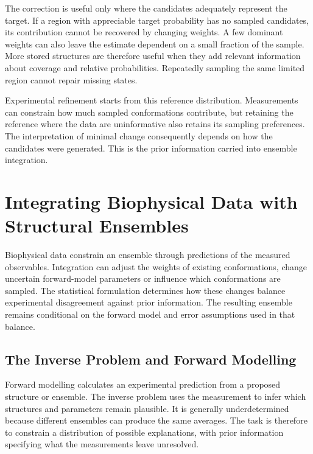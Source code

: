 The correction is useful only where the candidates adequately represent the target. If a region with appreciable target probability has no sampled candidates, its contribution cannot be recovered by changing weights. A few dominant weights can also leave the estimate dependent on a small fraction of the sample.\supercite{bmsb2012ch2} More stored structures are therefore useful when they add relevant information about coverage and relative probabilities. Repeatedly sampling the same limited region cannot repair missing states.

Experimental refinement starts from this reference distribution. Measurements can constrain how much sampled conformations contribute, but retaining the reference where the data are uninformative also retains its sampling preferences. The interpretation of minimal change consequently depends on how the candidates were generated. This is the prior information carried into ensemble integration.

\section{Integrating Biophysical Data with Structural Ensembles}
\label{sec:bg-integration}

Biophysical data constrain an ensemble through predictions of the measured observables. Integration can adjust the weights of existing conformations, change uncertain forward-model parameters or influence which conformations are sampled. The statistical formulation determines how these changes balance experimental disagreement against prior information.\supercite{bmsb2012ch12,cesariUsingMaximumEntropy2018} The resulting ensemble remains conditional on the forward model and error assumptions used in that balance.

\subsection{The Inverse Problem and Forward Modelling}
\label{sec:bg-inverse-problem}

Forward modelling calculates an experimental prediction from a proposed structure or ensemble. The inverse problem uses the measurement to infer which structures and parameters remain plausible. It is generally underdetermined because different ensembles can produce the same averages.\supercite{bmsb2012ch12,berlinRecoveringRepresentativeConformational2013} The task is therefore to constrain a distribution of possible explanations, with prior information specifying what the measurements leave unresolved.

